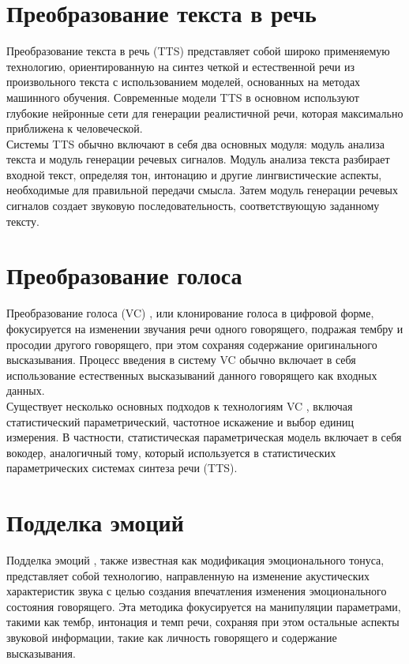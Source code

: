 \section{Преобразование текста в речь}

Преобразование текста в речь (TTS) \cite{wu2015spoofing} представляет собой широко применяемую технологию, ориентированную на синтез четкой и естественной речи из произвольного текста с использованием моделей, основанных на методах машинного обучения. Современные модели TTS в основном используют глубокие нейронные сети для генерации реалистичной речи, которая максимально приближена к человеческой.\\

Системы TTS обычно включают в себя два основных модуля: модуль анализа текста и модуль генерации речевых сигналов. Модуль анализа текста разбирает входной текст, определяя тон, интонацию и другие лингвистические аспекты, необходимые для правильной передачи смысла. Затем модуль генерации речевых сигналов создает звуковую последовательность, соответствующую заданному тексту.

\section{Преобразование голоса} 

Преобразование голоса (VC) \cite{wu2015spoofing}, или клонирование голоса в цифровой форме, фокусируется на изменении звучания речи одного говорящего, подражая тембру и просодии другого говорящего, при этом сохраняя содержание оригинального высказывания. Процесс введения в систему VC обычно включает в себя использование естественных высказываний данного говорящего как входных данных.\\

Существует несколько основных подходов к технологиям VC \cite{sisman2020overview}, включая статистический параметрический, частотное искажение и выбор единиц измерения. В частности, статистическая параметрическая модель включает в себя вокодер, аналогичный тому, который используется в статистических параметрических системах синтеза речи (TTS).
\section{Подделка эмоций}


Подделка эмоций \cite{zhao2022emofake}, также известная как модификация эмоционального тонуса, представляет собой технологию, направленную на изменение акустических характеристик звука с целью создания впечатления изменения эмоционального состояния говорящего. Эта методика фокусируется на манипуляции параметрами, такими как тембр, интонация и темп речи, сохраняя при этом остальные аспекты звуковой информации, такие как личность говорящего и содержание высказывания.

